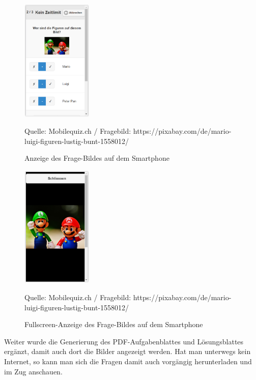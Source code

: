 \begin{figure}[H]
	\centering
	\includegraphics[width=0.3\textwidth]{Images/Frage-Bild_Anzeige_Mobile.PNG}
	\caption{Anzeige des Frage-Bildes auf dem Smartphone}
	Quelle: Mobilequiz.ch / Fragebild: https://pixabay.com/de/mario-luigi-figuren-lustig-bunt-1558012/
\end{figure}

\begin{figure}[H]
	\centering
	\includegraphics[width=0.3\textwidth]{Images/Frage-Bild_Anzeige_Mobile_Full.PNG}
	\caption{Fullscreen-Anzeige des Frage-Bildes auf dem Smartphone}
	Quelle: Mobilequiz.ch / Fragebild: https://pixabay.com/de/mario-luigi-figuren-lustig-bunt-1558012/
\end{figure}


Weiter wurde die Generierung des PDF-Aufgabenblattes und Lösungsblattes ergänzt, damit auch dort die Bilder angezeigt werden. Hat man unterwegs kein Internet, so kann man sich die Fragen damit auch vorgängig herunterladen und im Zug anschauen.



